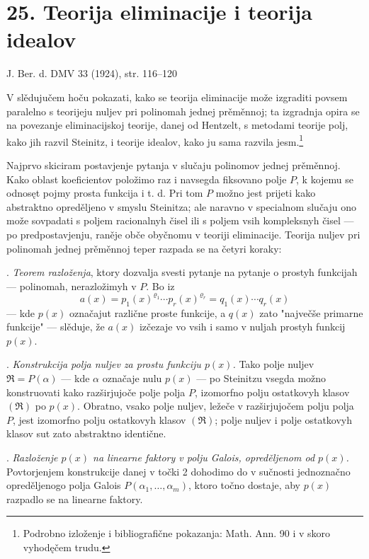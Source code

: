 \documentclass[11pt]{article}
\providecommand{\frakR}{\mathfrak R}
\begin{document}
\setcounter{footnote}{0}

\section*{25. Teorija eliminacije i teorija idealov}

\begin{center}
J. Ber. d. DMV 33 (1924), str. 116--120
\end{center}

V slědujučem hoču pokazati, kako se teorija eliminacije može izgraditi povsem paralelno s teorijeju nuljev pri polinomah jednej prěměnnoj; ta izgradnja opira se na povezanje eliminacijskoj teorije, danej od Hentzelt, s metodami teorije polj, kako jih razvil Steinitz, i teorije idealov, kako ju sama razvila jesm.\footnote{Podrobno izloženje i bibliografične pokazanja: Math. Ann. 90 i v skoro vyhodęčem trudu.}

Najprvo skiciram postavjenje pytanja v slučaju polinomov jednej prěměnnoj. Kako oblast koeficientov položimo raz i navsegda fiksovano polje $P$, k kojemu se odnosęt pojmy prosta funkcija i t. d. Pri tom $P$ možno jest prijeti kako abstraktno opreděljeno v smyslu Steinitza; ale naravno v specialnom slučaju ono može sovpadati s poljem racionalnyh čisel ili s poljem vsih kompleksnyh čisel --- po predpostavjenju, raněje obče obyčnomu v teoriji eliminacije. Teorija nuljev pri polinomah jednej prěměnnoj teper razpada se na četyri koraky:

. \emph{Teorem razloženja}, ktory dozvalja svesti pytanje na pytanje o prostyh funkcijah --- polinomah, nerazložimyh v $P$. Bo iz
\[
 a(x)=p_1(x)^{\varrho_1}\cdots p_r(x)^{\varrho_r}=q_1(x)\cdots q_r(x)
\]
--- kde $p(x)$ označajut različne proste funkcije, a $q(x)$ zato "največše primarne funkcije" --- slěduje, že $a(x)$ izčezaje vo vsih i samo v nuljah prostyh funkcij $p(x)$.

. \emph{Konstrukcija polja nuljev za prostu funkciju $p(x)$.} Tako polje nuljev $\frakR=P(\alpha)$ --- kde $\alpha$ označaje nulu $p(x)$ --- po Steinitzu vsegda možno konstruovati kako razširjujoče polje polja $P$, izomorfno polju ostatkovyh klasov $(\frakR)$ po $p(x)$. Obratno, vsako polje nuljev, ležeče v razširjujočem polju polja $P$, jest izomorfno polju ostatkovyh klasov $(\frakR)$; polje nuljev i polje ostatkovyh klasov sut zato abstraktno identične.

. \emph{Razloženje $p(x)$ na linearne faktory v polju Galois, opreděljenom od $p(x)$.} Povtorjenjem konstrukcije danej v točki 2 dohodimo do v sučnosti jednoznačno opreděljenogo polja Galois $P(\alpha_1,\ldots,\alpha_m)$, ktoro točno dostaje, aby $p(x)$ razpadlo se na linearne faktory.
\end{document}
